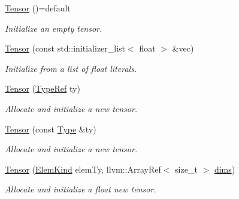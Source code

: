 \begin{DoxyCompactItemize}
\item 
\mbox{\label{classglow_1_1_tensor_a9a89f5d8183362c9baa5c6645aa8dfe6}} 
\hyperlink{classglow_1_1_tensor_a9a89f5d8183362c9baa5c6645aa8dfe6}{Tensor} ()=default
\begin{DoxyCompactList}\small\item\em Initialize an empty tensor. \end{DoxyCompactList}\item 
\mbox{\label{classglow_1_1_tensor_a4fc52422cff0e2bc0276c808578af1d6}} 
\hyperlink{classglow_1_1_tensor_a4fc52422cff0e2bc0276c808578af1d6}{Tensor} (const std\+::initializer\+\_\+list$<$ float $>$ \&vec)
\begin{DoxyCompactList}\small\item\em Initialize from a list of float literals. \end{DoxyCompactList}\item 
\mbox{\label{classglow_1_1_tensor_a796a7a282d6a74c575bbbcb075292910}} 
\hyperlink{classglow_1_1_tensor_a796a7a282d6a74c575bbbcb075292910}{Tensor} (\hyperlink{structglow_1_1_type}{Type\+Ref} ty)
\begin{DoxyCompactList}\small\item\em Allocate and initialize a new tensor. \end{DoxyCompactList}\item 
\mbox{\label{classglow_1_1_tensor_aa77474ecb6a18092b9b4f180c22f2ec7}} 
\hyperlink{classglow_1_1_tensor_aa77474ecb6a18092b9b4f180c22f2ec7}{Tensor} (const \hyperlink{structglow_1_1_type}{Type} \&ty)
\begin{DoxyCompactList}\small\item\em Allocate and initialize a new tensor. \end{DoxyCompactList}\item 
\mbox{\label{classglow_1_1_tensor_a2543ba8816bd9cf0e6a48fec62de3843}} 
\hyperlink{classglow_1_1_tensor_a2543ba8816bd9cf0e6a48fec62de3843}{Tensor} (\hyperlink{namespaceglow_ab92e14a94329daf4083db670e95fbcdf}{Elem\+Kind} elem\+Ty, llvm\+::\+Array\+Ref$<$ size\+\_\+t $>$ \hyperlink{classglow_1_1_tensor_ad299b107d8ed92bb55392c4cb97070d9}{dims})
\begin{DoxyCompactList}\small\item\em Allocate and initialize a float new tensor. \end{DoxyCompactList}\item 

\end{DoxyCompactItemize}
